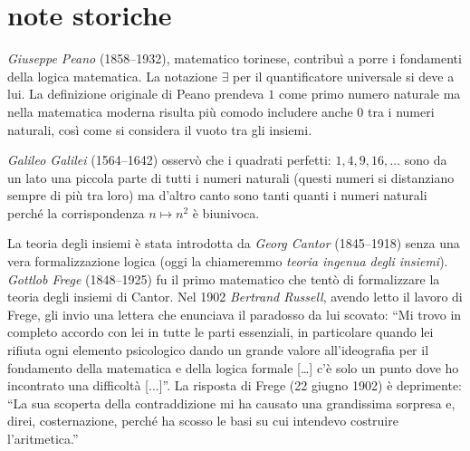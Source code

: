 \section{note storiche}

\label{nota:Peano}%
%
\emph{Giuseppe Peano} (1858--1932), matematico torinese, contribuì a porre 
i fondamenti della logica matematica. 
La notazione $\exists$ per il quantificatore universale si deve a lui.
La definizione originale di Peano prendeva $1$ come primo numero
naturale ma nella matematica moderna risulta più comodo includere anche $0$ 
tra i numeri naturali, così come si considera il vuoto tra gli insiemi.

\label{nota:Galileo}%
%
\emph{Galileo Galilei} (1564--1642) osservò che i quadrati 
perfetti: $1,4,9,16,\dots$ sono da un lato una piccola parte 
di tutti i numeri naturali (questi numeri si distanziano 
sempre di più tra loro) ma d'altro canto sono tanti quanti i numeri naturali 
perché la corrispondenza $n\mapsto n^2$ è biunivoca.

\label{nota:Cantor}%
%
\label{nota:Russell}%
%
\label{nota:Frege}%
%
La teoria degli insiemi
è stata introdotta da \emph{Georg Cantor} (1845--1918) senza una vera formalizzazione logica
(oggi la chiameremmo \emph{teoria ingenua degli insiemi}).
\emph{Gottlob Frege} (1848--1925) fu il primo matematico che tentò di formalizzare 
la teoria degli insiemi di Cantor. 
Nel 1902 \emph{Bertrand Russell}, avendo letto il lavoro di Frege, 
gli invio una lettera che enunciava il paradosso da lui scovato:
``Mi trovo in completo accordo con lei in tutte le parti essenziali, in particolare
quando lei rifiuta ogni elemento psicologico dando un grande valore
all'ideografia %
per il fondamento della matematica e della logica formale [\dots] c'è solo
un punto dove ho incontrato una difficoltà [...]''.
La risposta di Frege (22 giugno 1902) è deprimente:
``La sua scoperta della contraddizione mi ha causato una grandissima sorpresa e,
direi, costernazione, perché ha scosso le basi su cui intendevo costruire l'aritmetica.''
